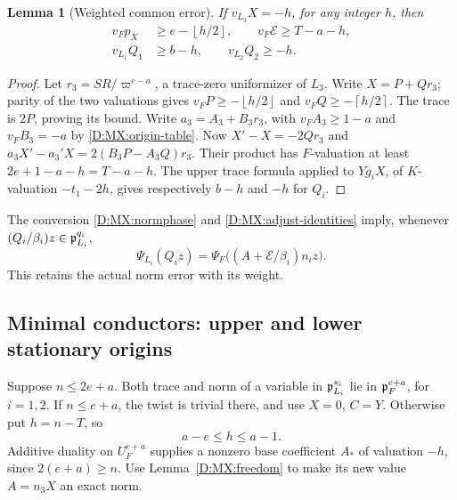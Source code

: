 \documentclass[11pt]{amsart}
\newtheorem{lemma}[theorem]{Lemma}
\theoremstyle{definition}
\theoremstyle{remark}
\newcommand{\ceil}[1]{\left\lceil #1\right\rceil}
\newcommand{\floor}[1]{\left\lfloor #1\right\rfloor}
\begin{document}
\begin{lemma}[Weighted common error]\label{D:MX:errors}
If $v_{L_3}X=-h$, for any integer $h$, then
\begin{equation}\label{D:MX:error-bounds}
 \begin{split}
 v_Fp_X&\ge e-\floor{h/2},\qquad
 v_F\mathcal E\ge T-a-h,\\
 v_{L_1}Q_1&\ge b-h,\qquad v_{L_2}Q_2\ge-h.
 \end{split}
\end{equation}
\end{lemma}
\begin{proof}
Let $r_3=SR/\varpi^{e-a}$, a trace-zero uniformizer of $L_3$.
Write $X=P+Qr_3$; parity of the two valuations gives
$v_FP\ge-\floor{h/2}$ and $v_FQ\ge-\ceil{h/2}$.
The trace is $2P$, proving its bound. Write $a_3=A_3+B_3r_3$, with
$v_FA_3\ge1-a$ and $v_FB_3=-a$ by \eqref{D:MX:origin-table}.
Now $X'-X=-2Qr_3$ and
$a_3X'-a_3'X=2(B_3P-A_3Q)r_3$.
Their product has $F$-valuation at least $2e+1-a-h=T-a-h$.
The upper trace formula applied to $Yg_iX$, of $K$-valuation
$-t_1-2h$, gives respectively $b-h$ and $-h$ for $Q_i$.
\end{proof}
The conversion \eqref{D:MX:normphase} and \eqref{D:MX:adjust-identities} imply,
whenever $(Q_i/\beta_i)z\in\mathfrak p_{L_i}^{q_i}$,
\begin{equation}\label{D:MX:Qphase}
 \Psi_{L_i}(Q_i z)
   =\Psi_F\bigl((A+\mathcal E/\beta_i)n_i z\bigr).
\end{equation}
This retains the actual norm error with its weight.

\subsection{Minimal conductors: upper and lower stationary origins}
Suppose $n\le2e+a$. Both trace and norm of a variable in
$\mathfrak p_{L_i}^{s_i}$ lie in $\mathfrak p_F^{e+a}$, for $i=1,2$.
If $n\le e+a$, the twist is trivial there, and use $X=0$, $C=Y$.
Otherwise put $h=n-T$, so
\begin{equation}\label{D:MX:minimal-range}
 a-e\le h\le a-1.
\end{equation}
Additive duality on $U_F^{e+a}$ supplies a nonzero base coefficient
$A_*$ of valuation $-h$, since $2(e+a)\ge n$.
Use Lemma~\ref{D:MX:freedom} to make its new value $A=n_3X$ an exact norm.
\end{document}
